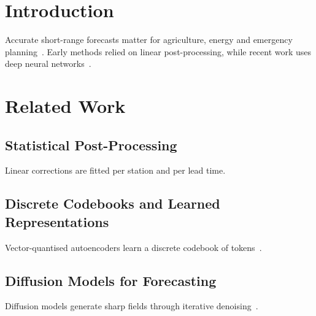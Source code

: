 \section{Introduction}
\label{sec:intro}
Accurate short-range forecasts matter for agriculture, energy and emergency planning~\cite{lamport1994latex}.
Early methods relied on linear post-processing, while recent work uses deep neural networks~\cite{vaswani2017attention}.

\section{Related Work}
\label{sec:related}

\subsection{Statistical Post-Processing}
Linear corrections are fitted per station and per lead time.

\subsection{Discrete Codebooks and Learned Representations}
Vector-quantised autoencoders learn a discrete codebook of tokens~\cite{knuth1984}.

\subsection{Diffusion Models for Forecasting}
Diffusion models generate sharp fields through iterative denoising~\cite{ho2020denoising}.
